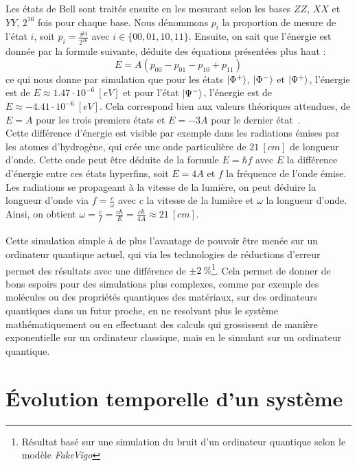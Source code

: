 Les états de Bell sont traités ensuite en les mesurant selon les bases $ZZ$, $XX$ et $YY$,
$2^{16}$ fois pour chaque base.
Nous dénommons $p_{i}$ la proportion de mesure de l'état $i$, soit $p_{i} = \frac{\# i}{2^{16}}$
avec $i \in \{00, 01, 10, 11\}$.
Ensuite, on sait que l'énergie est donnée par la formule suivante, déduite des équations
présentées plus haut :
\[
    E = A (p_{00} - p_{01} - p_{10} + p_{11})
\]
ce qui nous donne par simulation que pour les états $\ket{\Phi^+}$, $\ket{\Phi^-}$ et $\ket{\Psi^+}$,
l'énergie est de $E \approx 1.47 \cdot 10^{-6} \ [eV]$ et pour l'état $\ket{\Psi^-}$, l'énergie est
de $E \approx -4.41 \cdot 10^{-6} \ [eV]$.
Cela correspond bien aux valeurs théoriques attendues, de $E = A$ pour les trois premiers états et
$E = -3A$ pour le dernier état~\cite{feynmann-lectures}.\\
Cette différence d'énergie est visible par exemple dans les radiations émises par les atomes
d'hydrogène, qui crée une onde particulière de $21 \ [cm]$ de longueur d'onde.
Cette onde peut être déduite de la formule $E = \hbar f$ avec $E$ la différence d'énergie entre
ces états hyperfins, soit $E = 4A$ et $f$ la fréquence de l'onde émise.
Les radiations se propageant à la vitesse de la lumière, on peut déduire la longueur d'onde
via $f = \frac{c}{\omega}$ avec $c$ la vitesse de la lumière et $\omega$ la longueur d'onde.
Ainsi, on obtient $\omega = \frac{c}{f} = \frac{c \hbar}{E} = \frac{c \hbar}{4A} \approx 21 \ [cm]$.\\ \\
Cette simulation simple à de plus l'avantage de pouvoir être menée sur un ordinateur quantique
actuel, qui via les technologies de réductions d'erreur permet des résultats avec une différence
de $\pm 2 \ \%$\footnote{Résultat basé sur une simulation du bruit d'un ordinateur quantique selon le modèle \textit{FakeVigo}}.
Cela permet de donner de bons espoirs pour des simulations plus complexes, comme par exemple
des molécules ou des propriétés quantiques des matériaux, sur des ordinateurs quantiques dans un futur proche,
en ne resolvant plus le système mathématiquement ou en effectuant des calculs qui grossissent de manière exponentielle
sur un ordinateur classique, mais en le simulant sur un ordinateur quantique.

\section{Évolution temporelle d'un système}\label{sec:evolution-temporel-d'un-systeme}


